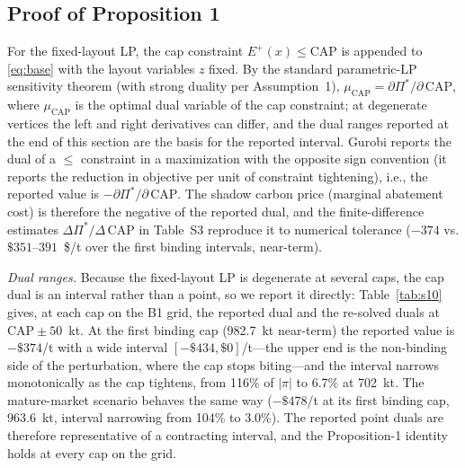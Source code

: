 \subsection{Proof of Proposition 1}

For the fixed-layout LP, the cap constraint $E^{+}(x)\le\mathrm{CAP}$ is
appended to \eqref{eq:base} with the layout variables $z$ fixed. By the
standard parametric-LP sensitivity theorem (with strong duality per
Assumption~1),
$\mu_{\mathrm{CAP}}=\partial\Pi^{*}/\partial\,\mathrm{CAP}$, where
$\mu_{\mathrm{CAP}}$ is the optimal dual variable of the cap constraint; at
degenerate vertices the left and right derivatives can differ, and the dual
ranges reported at the end of this section are the basis for the reported
interval.
Gurobi reports the dual of a $\le$ constraint in a maximization with the
opposite sign convention (it reports the reduction in objective per unit of
constraint tightening), i.e., the reported value is
$-\partial\Pi^{*}/\partial\,\mathrm{CAP}$. The shadow carbon price
(marginal abatement cost) is therefore the negative of the reported dual, and
the finite-difference estimates
$\Delta\Pi^{*}/\Delta\,\mathrm{CAP}$ in Table~S3 reproduce it to numerical
tolerance ($-374$ vs. $\$351$--$391$~\$/t over the first binding intervals,
near-term).

\emph{Dual ranges.} Because the fixed-layout LP is degenerate at several caps,
the cap dual is an interval rather than a point, so we report it directly:
Table~\ref{tab:s10} gives, at each cap on the B1 grid, the reported dual and
the re-solved duals at $\mathrm{CAP}\pm50$~kt. At the first binding cap
(982.7~kt near-term) the reported value is $-\$374$/t with a wide interval
$[-\$434, \$0]$/t---the upper end is the non-binding side of the perturbation,
where the cap stops biting---and the interval narrows monotonically as the cap
tightens, from 116\% of $|\pi|$ to 6.7\% at 702~kt. The mature-market scenario
behaves the same way ($-\$478$/t at its first binding cap, 963.6~kt, interval
narrowing from 104\% to 3.0\%). The reported point duals are therefore
representative of a contracting interval, and the Proposition-1 identity holds
at every cap on the grid.

\begin{table}[htbp]
\centering
\footnotesize
\setlength{\tabcolsep}{4pt}
\caption{Gross-emission cap duals and their degenerate-vertex intervals
(review R1-M4): the reported dual $-\mu_{\mathrm{CAP}}$, the dual re-solved at
$\mathrm{CAP}-50$~kt and $\mathrm{CAP}+50$~kt, and the interval width relative
to the reported value (n/a where the cap does not bind and the dual is zero).
Generated by \texttt{v091\_extras.jl}.}
\label{tab:s10}

\end{table}

